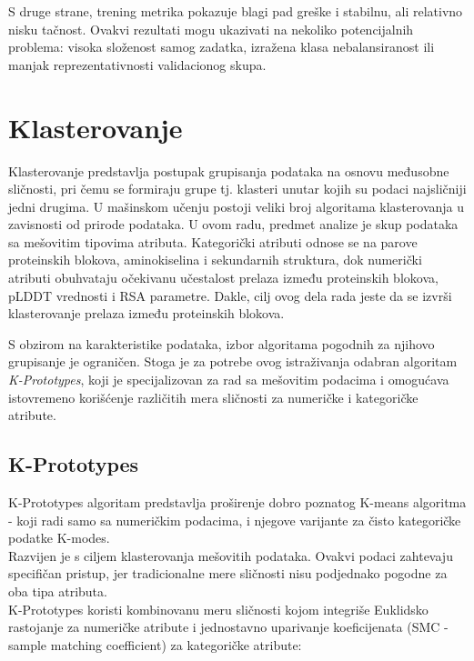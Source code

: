 \documentclass[a4paper,12pt]{article}
\begin{document}
S druge strane, trening metrika pokazuje blagi pad greške i stabilnu, ali relativno nisku tačnost. Ovakvi rezultati mogu ukazivati na nekoliko potencijalnih problema: visoka složenost samog zadatka, izražena klasa nebalansiranost ili manjak reprezentativnosti validacionog skupa.

\newpage
\section{Klasterovanje}
Klasterovanje predstavlja postupak grupisanja podataka na osnovu međusobne sličnosti, pri čemu se formiraju grupe tj. klasteri unutar kojih su podaci najsličniji jedni drugima. U mašinskom učenju postoji veliki broj algoritama klasterovanja u zavisnosti od prirode podataka. U ovom radu, predmet analize je skup podataka sa mešovitim tipovima atributa. Kategorički atributi odnose se na parove proteinskih blokova, aminokiselina i sekundarnih struktura, dok numerički atributi obuhvataju očekivanu učestalost prelaza između proteinskih blokova, pLDDT vrednosti i RSA parametre. Dakle, cilj ovog dela rada jeste da se izvrši klasterovanje prelaza između proteinskih blokova.

S obzirom na karakteristike podataka, izbor algoritama pogodnih za njihovo grupisanje je ograničen. Stoga je za potrebe ovog istraživanja odabran algoritam \textit{K-Prototypes}, koji je specijalizovan za rad sa mešovitim podacima i omogućava istovremeno korišćenje različitih mera sličnosti za numeričke i kategoričke atribute.

\subsection{K-Prototypes}
K-Prototypes algoritam predstavlja proširenje dobro poznatog K-means algoritma - koji radi samo sa numeričkim podacima, i njegove varijante za čisto kategoričke podatke K-modes.
\\ Razvijen je s ciljem klasterovanja mešovitih podataka. Ovakvi podaci zahtevaju specifičan pristup, jer tradicionalne mere sličnosti nisu podjednako pogodne za oba tipa atributa.
\\ K-Prototypes koristi kombinovanu meru sličnosti kojom integriše Euklidsko rastojanje za numeričke atribute i jednostavno uparivanje koeficijenata (SMC - sample matching coefficient) za kategoričke atribute:
\end{document}
